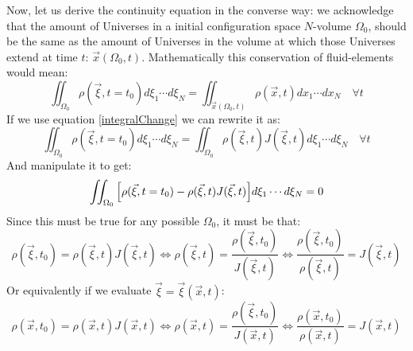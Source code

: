 \documentclass[11pt, a4paper]{article} %
\begin{document}
Now, let us derive the continuity equation in the converse way: we acknowledge that the amount of Universes in a initial configuration space $N$-volume $\Omega_0$, should be the same as the amount of Universes in the volume at which those Universes extend at time $t$: $\vec{x}(\Omega_0,t)$. Mathematically this conservation of fluid-elements would mean:
\begin{equation}
\iint_{\Omega_0} \rho(\vec{\xi},t=t_0) d\xi_1\cdots d\xi_N=\iint_{\vec{x}(\Omega_0,t)} \rho(\vec{x},t) dx_1\cdots dx_N\quad \forall t
\end{equation}
If we use equation \eqref{integralChange} we can rewrite it as:
\begin{equation}
\iint_{\Omega_0} \rho(\vec{\xi},t=t_0) d\xi_1\cdots d\xi_N=\iint_{\Omega_0} \rho(\vec{\xi},t) J(\vec{\xi},t) d\xi_1\cdots d\xi_N \quad \forall t
\end{equation}
And manipulate it to get:
\begin{equation}
\iint_{\Omega_0} \qty[ \rho(\vec{\xi},t=t_0) -\rho(\vec{\xi},t) J(\vec{\xi},t) ]d\xi_1\cdots d\xi_N=0
\end{equation}
Since this must be true for any possible $\Omega_0$, it must be that:
\begin{equation}
\rho(\vec{\xi},t_0) = \rho(\vec{\xi},t) J(\vec{\xi},t)\Longleftrightarrow \rho(\vec{\xi},t)=\frac{\rho(\vec{\xi},t_0)}{J(\vec{\xi},t)}\Longleftrightarrow \frac{\rho(\vec{\xi},t_0)}{\rho(\vec{\xi},t)}=J(\vec{\xi},t)
\end{equation}
Or equivalently if we evaluate $\vec{\xi}=\vec{\xi}(\vec{x},t)$:
\begin{equation}
\rho(\vec{x},t_0) = \rho(\vec{x},t) J(\vec{x},t)\Longleftrightarrow \rho(\vec{x},t)=\frac{\rho(\vec{\xi},t_0)}{J(\vec{x},t)}\Longleftrightarrow \frac{\rho(\vec{x},t_0)}{\rho(\vec{x},t)}=J(\vec{x},t)
\end{equation}
\end{document}
